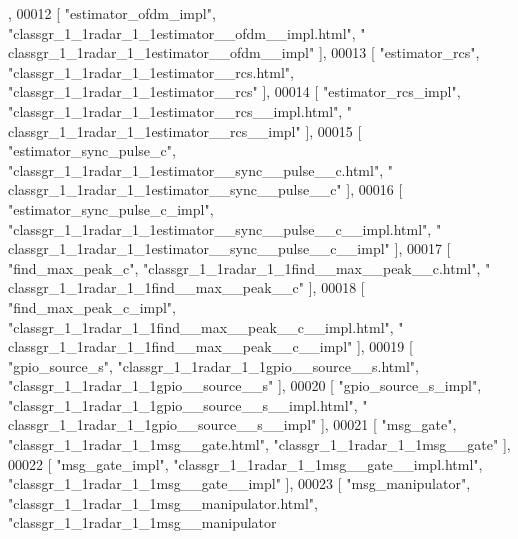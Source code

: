 \begin{DoxyCode}
      ,
00012     [ \textcolor{stringliteral}{"estimator\_ofdm\_impl"}, \textcolor{stringliteral}{"classgr\_1\_1radar\_1\_1estimator\_\_ofdm\_\_impl.html"}, \textcolor{stringliteral}{"
      classgr\_1\_1radar\_1\_1estimator\_\_ofdm\_\_impl"} ],
00013     [ \textcolor{stringliteral}{"estimator\_rcs"}, \textcolor{stringliteral}{"classgr\_1\_1radar\_1\_1estimator\_\_rcs.html"}, \textcolor{stringliteral}{"classgr\_1\_1radar\_1\_1estimator\_\_rcs"} ],
00014     [ \textcolor{stringliteral}{"estimator\_rcs\_impl"}, \textcolor{stringliteral}{"classgr\_1\_1radar\_1\_1estimator\_\_rcs\_\_impl.html"}, \textcolor{stringliteral}{"
      classgr\_1\_1radar\_1\_1estimator\_\_rcs\_\_impl"} ],
00015     [ \textcolor{stringliteral}{"estimator\_sync\_pulse\_c"}, \textcolor{stringliteral}{"classgr\_1\_1radar\_1\_1estimator\_\_sync\_\_pulse\_\_c.html"}, \textcolor{stringliteral}{"
      classgr\_1\_1radar\_1\_1estimator\_\_sync\_\_pulse\_\_c"} ],
00016     [ \textcolor{stringliteral}{"estimator\_sync\_pulse\_c\_impl"}, \textcolor{stringliteral}{"classgr\_1\_1radar\_1\_1estimator\_\_sync\_\_pulse\_\_c\_\_impl.html"}, \textcolor{stringliteral}{"
      classgr\_1\_1radar\_1\_1estimator\_\_sync\_\_pulse\_\_c\_\_impl"} ],
00017     [ \textcolor{stringliteral}{"find\_max\_peak\_c"}, \textcolor{stringliteral}{"classgr\_1\_1radar\_1\_1find\_\_max\_\_peak\_\_c.html"}, \textcolor{stringliteral}{"
      classgr\_1\_1radar\_1\_1find\_\_max\_\_peak\_\_c"} ],
00018     [ \textcolor{stringliteral}{"find\_max\_peak\_c\_impl"}, \textcolor{stringliteral}{"classgr\_1\_1radar\_1\_1find\_\_max\_\_peak\_\_c\_\_impl.html"}, \textcolor{stringliteral}{"
      classgr\_1\_1radar\_1\_1find\_\_max\_\_peak\_\_c\_\_impl"} ],
00019     [ \textcolor{stringliteral}{"gpio\_source\_s"}, \textcolor{stringliteral}{"classgr\_1\_1radar\_1\_1gpio\_\_source\_\_s.html"}, \textcolor{stringliteral}{"classgr\_1\_1radar\_1\_1gpio\_\_source\_\_s"} ],
00020     [ \textcolor{stringliteral}{"gpio\_source\_s\_impl"}, \textcolor{stringliteral}{"classgr\_1\_1radar\_1\_1gpio\_\_source\_\_s\_\_impl.html"}, \textcolor{stringliteral}{"
      classgr\_1\_1radar\_1\_1gpio\_\_source\_\_s\_\_impl"} ],
00021     [ \textcolor{stringliteral}{"msg\_gate"}, \textcolor{stringliteral}{"classgr\_1\_1radar\_1\_1msg\_\_gate.html"}, \textcolor{stringliteral}{"classgr\_1\_1radar\_1\_1msg\_\_gate"} ],
00022     [ \textcolor{stringliteral}{"msg\_gate\_impl"}, \textcolor{stringliteral}{"classgr\_1\_1radar\_1\_1msg\_\_gate\_\_impl.html"}, \textcolor{stringliteral}{"classgr\_1\_1radar\_1\_1msg\_\_gate\_\_impl"} ],
00023     [ \textcolor{stringliteral}{"msg\_manipulator"}, \textcolor{stringliteral}{"classgr\_1\_1radar\_1\_1msg\_\_manipulator.html"}, \textcolor{stringliteral}{"classgr\_1\_1radar\_1\_1msg\_\_manipulator
}
\end{DoxyCode}
